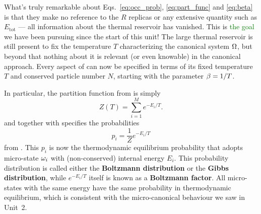 What's truly remarkable about Eqs.~\ref{eq:occ_prob}, \ref{eq:part_func} and \ref{eq:beta} is that they make no reference to the $R$ replicas or any extensive quantity such as $E_{\text{tot}}$ --- all information about the thermal reservoir has vanished.
This is \textcolor{green}{the goal} we have been pursuing since the start of this unit!
The large thermal reservoir is still present to fix the temperature $T$ characterizing the canonical system $\Omega$, but beyond that nothing about it is relevant (or even knowable) in the canonical approach.
Every aspect of \Om can now be specified in terms of its fixed temperature $T$ and conserved particle number $N$, starting with the parameter $\beta = 1 / T$.

In particular, the partition function from  is simply
\begin{equation}
  \label{eq:canon_part_func}
  Z(T) = \sum_{i = 1}^M e^{-E_i / T}.
\end{equation}
and together with \be specifies the probabilities
\begin{equation}
  \label{eq:canon_prob}
  p_i = \frac{1}{Z} e^{-E_i / T}
\end{equation}
from .
This $p_i$ is now the thermodynamic equilibrium probability that \Om adopts micro-state $\omega_i$ with (non-conserved) internal energy $E_i$.
This probability distribution is called either the \textbf{Boltzmann distribution} or the \textbf{Gibbs distribution}, while $e^{-E_i / T}$ itself is known as a \textbf{Boltzmann factor}.
All micro-states with the same energy have the same probability in thermodynamic equilibrium, which is consistent with the micro-canonical behaviour we saw in Unit~2.




